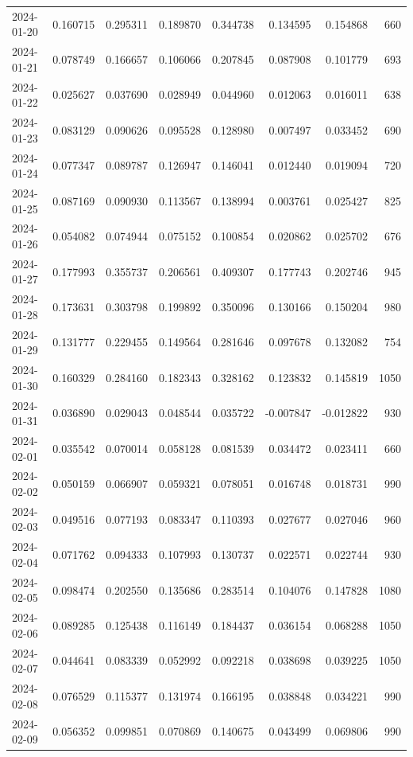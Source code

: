 \begin{tabular}{lrrrrrrr}
2024-01-20 & 0.160715 & 0.295311 & 0.189870 & 0.344738 & 0.134595 & 0.154868 & 660 \\
2024-01-21 & 0.078749 & 0.166657 & 0.106066 & 0.207845 & 0.087908 & 0.101779 & 693 \\
2024-01-22 & 0.025627 & 0.037690 & 0.028949 & 0.044960 & 0.012063 & 0.016011 & 638 \\
2024-01-23 & 0.083129 & 0.090626 & 0.095528 & 0.128980 & 0.007497 & 0.033452 & 690 \\
2024-01-24 & 0.077347 & 0.089787 & 0.126947 & 0.146041 & 0.012440 & 0.019094 & 720 \\
2024-01-25 & 0.087169 & 0.090930 & 0.113567 & 0.138994 & 0.003761 & 0.025427 & 825 \\
2024-01-26 & 0.054082 & 0.074944 & 0.075152 & 0.100854 & 0.020862 & 0.025702 & 676 \\
2024-01-27 & 0.177993 & 0.355737 & 0.206561 & 0.409307 & 0.177743 & 0.202746 & 945 \\
2024-01-28 & 0.173631 & 0.303798 & 0.199892 & 0.350096 & 0.130166 & 0.150204 & 980 \\
2024-01-29 & 0.131777 & 0.229455 & 0.149564 & 0.281646 & 0.097678 & 0.132082 & 754 \\
2024-01-30 & 0.160329 & 0.284160 & 0.182343 & 0.328162 & 0.123832 & 0.145819 & 1050 \\
2024-01-31 & 0.036890 & 0.029043 & 0.048544 & 0.035722 & -0.007847 & -0.012822 & 930 \\
2024-02-01 & 0.035542 & 0.070014 & 0.058128 & 0.081539 & 0.034472 & 0.023411 & 660 \\
2024-02-02 & 0.050159 & 0.066907 & 0.059321 & 0.078051 & 0.016748 & 0.018731 & 990 \\
2024-02-03 & 0.049516 & 0.077193 & 0.083347 & 0.110393 & 0.027677 & 0.027046 & 960 \\
2024-02-04 & 0.071762 & 0.094333 & 0.107993 & 0.130737 & 0.022571 & 0.022744 & 930 \\
2024-02-05 & 0.098474 & 0.202550 & 0.135686 & 0.283514 & 0.104076 & 0.147828 & 1080 \\
2024-02-06 & 0.089285 & 0.125438 & 0.116149 & 0.184437 & 0.036154 & 0.068288 & 1050 \\
2024-02-07 & 0.044641 & 0.083339 & 0.052992 & 0.092218 & 0.038698 & 0.039225 & 1050 \\
2024-02-08 & 0.076529 & 0.115377 & 0.131974 & 0.166195 & 0.038848 & 0.034221 & 990 \\
2024-02-09 & 0.056352 & 0.099851 & 0.070869 & 0.140675 & 0.043499 & 0.069806 & 990 \\

\end{tabular}
